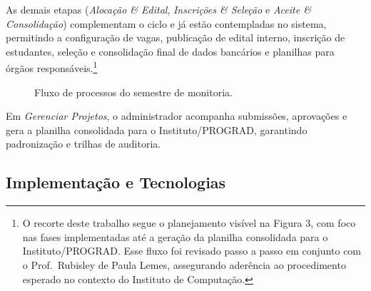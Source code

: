 \documentclass[portuguese]{sbc2025}%
\begin{document}
As demais etapas (\textit{Alocação \& Edital}, \textit{Inscrições \& Seleção} e \textit{Aceite \& Consolidação}) complementam o ciclo e já estão contempladas no sistema, permitindo a configuração de vagas, publicação de edital interno, inscrição de estudantes, seleção e consolidação final de dados bancários e planilhas para órgãos responsáveis.\footnote{O recorte deste trabalho segue o planejamento visível na Figura 3, com foco nas fases implementadas até a geração da planilha consolidada para o Instituto/PROGRAD. Esse fluxo foi revisado passo a passo em conjunto com o Prof.\ Rubisley de Paula Lemes, assegurando aderência ao procedimento esperado no contexto do Instituto de Computação.}

\begin{figure}[!htbp]
  \centering
  \caption{Fluxo de processos do semestre de monitoria.}
  \label{fig:process-flow}
\end{figure}

Em \textit{Gerenciar Projetos}, o administrador acompanha submissões, aprovações e gera a planilha consolidada para o Instituto/PROGRAD, garantindo padronização e trilhas de auditoria.

\subsection{Implementação e Tecnologias}
\end{document}
